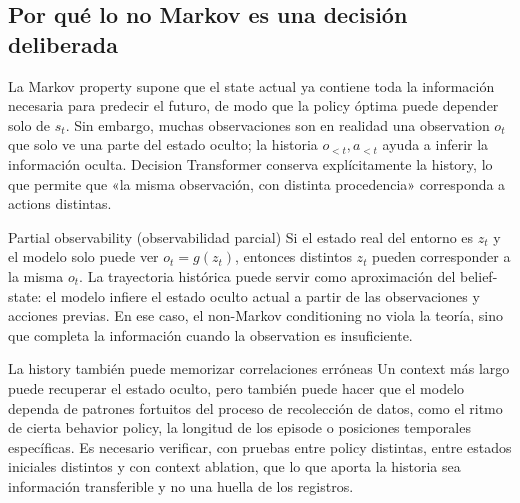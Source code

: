 \documentclass[a4paper]{article}
\begin{document}
\subsection{Por qué lo no Markov es una decisión deliberada}

La Markov property supone que el state actual ya contiene toda la información necesaria para predecir el futuro, de modo que la policy óptima puede depender solo de $s_t$. Sin embargo, muchas observaciones son en realidad una observation $o_t$ que solo ve una parte del estado oculto; la historia $o_{<t},a_{<t}$ ayuda a inferir la información oculta. Decision Transformer conserva explícitamente la history, lo que permite que «la misma observación, con distinta procedencia» corresponda a actions distintas.

\begin{knowledgebox}{Partial observability (observabilidad parcial)}
Si el estado real del entorno es $z_t$ y el modelo solo puede ver $o_t=g(z_t)$, entonces distintos $z_t$ pueden corresponder a la misma $o_t$. La trayectoria histórica puede servir como aproximación del belief-state: el modelo infiere el estado oculto actual a partir de las observaciones y acciones previas. En ese caso, el non-Markov conditioning no viola la teoría, sino que completa la información cuando la observation es insuficiente.
\end{knowledgebox}


\begin{warningbox}{La history también puede memorizar correlaciones erróneas}
Un context más largo puede recuperar el estado oculto, pero también puede hacer que el modelo dependa de patrones fortuitos del proceso de recolección de datos, como el ritmo de cierta behavior policy, la longitud de los episode o posiciones temporales específicas. Es necesario verificar, con pruebas entre policy distintas, entre estados iniciales distintos y con context ablation, que lo que aporta la historia sea información transferible y no una huella de los registros.
\end{warningbox}
\end{document}
